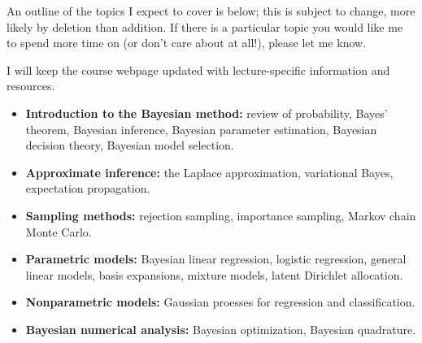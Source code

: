 \documentclass{article}
\begin{document}
An outline of the topics I expect to cover is below; this is subject
to change, more likely by deletion than addition.  If there is a
particular topic you would like me to spend more time on (or don't
care about at all!), please let me know.

I will keep the course webpage updated with lecture-specific
information and resources.

\begin{itemize}
\item \textbf{Introduction to the Bayesian method:} review of
  probability, Bayes' theorem, Bayesian inference, Bayesian parameter
  estimation, Bayesian decision theory, Bayesian model selection.
\item \textbf{Approximate inference:} the Laplace approximation,
  variational Bayes, expectation propagation.
\item \textbf{Sampling methods:} rejection sampling, importance
  sampling, Markov chain Monte Carlo.
\item \textbf{Parametric models:} Bayesian linear regression, logistic
  regression, general linear models, basis expansions, mixture models,
  latent Dirichlet allocation.
\item \textbf{Nonparametric models:} Gaussian proesses for regression
  and classification.
\item \textbf{Bayesian numerical analysis:} Bayesian optimization,
  Bayesian quadrature.
\end{itemize}
\end{document}
